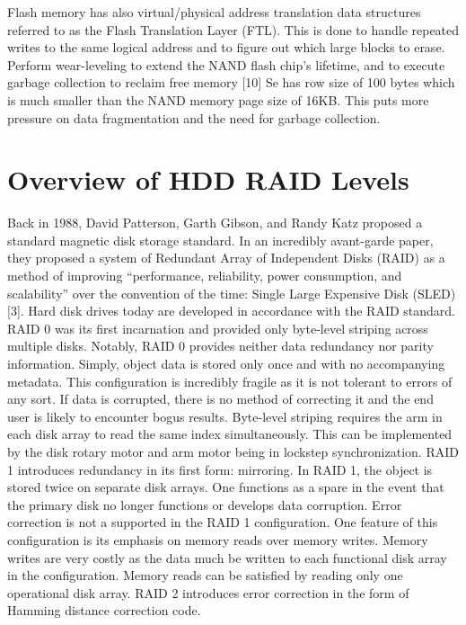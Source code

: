 \documentclass[letterpaper, 10 pt, conference]{ieeeconf}
\begin{document}
Flash memory has also virtual/physical address translation data structures referred to as the Flash Translation Layer (FTL).  This is done to handle repeated writes to the same logical address and to figure out which large blocks to erase.
Perform wear-leveling to extend the NAND flash chip’s lifetime, and to execute garbage collection to reclaim free memory [10]
Se has row size of 100 bytes which is much smaller than the NAND memory page size of 16KB.  This puts more pressure on data fragmentation and the need for garbage collection.

\section{Overview of HDD RAID Levels}
Back in 1988, David Patterson, Garth Gibson, and Randy Katz proposed a standard magnetic disk storage standard.  In an incredibly avant-garde paper, they proposed a system of Redundant Array of Independent Disks (RAID) as a method of improving “performance, reliability, power consumption, and scalability” over the convention of the time: Single Large Expensive Disk (SLED) [3].  Hard disk drives today are developed in accordance with the RAID standard.  RAID 0 was its first incarnation and provided only byte-level striping across multiple disks.  Notably, RAID 0 provides neither data redundancy nor parity information.  Simply, object data is stored only once and with no accompanying metadata.  This configuration is incredibly fragile as it is not tolerant to errors of any sort.  If data is corrupted, there is no method of correcting it and the end user is likely to encounter bogus results.  Byte-level striping requires the arm in each disk array to read the same index simultaneously.  This can be implemented by the disk rotary motor and arm motor being in lockstep synchronization.  RAID 1 introduces redundancy in its first form: mirroring.  In RAID 1, the object is stored twice on separate disk arrays.  One functions as a spare in the event that the primary disk no longer functions or develops data corruption.  Error correction is not a supported in the RAID 1 configuration.  One feature of this configuration is its emphasis on memory reads over memory writes.  Memory writes are very costly as the data much be written to each functional disk array in the configuration.  Memory reads can be satisfied by reading only one operational disk array.  RAID 2 introduces error correction in the form of Hamming distance correction code.  
\end{document}

